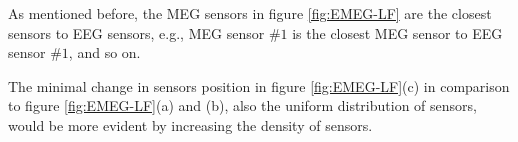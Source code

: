 As mentioned before, the MEG sensors in figure \ref{fig:EMEG-LF} are the closest sensors to EEG sensors, e.g., MEG sensor $\#1$ is the closest MEG sensor to EEG sensor $\#1$, and so on.

The minimal change in sensors position in figure \ref{fig:EMEG-LF}(c) in comparison to figure \ref{fig:EMEG-LF}(a) and (b), also the uniform distribution of sensors, would be more evident by increasing the density of sensors.




\FloatBarrier
